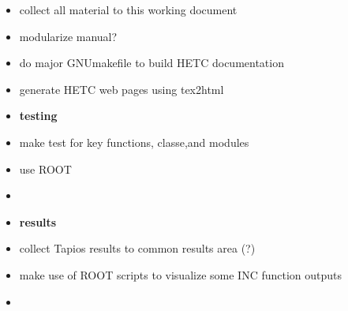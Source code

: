 \begin{itemize}
\item collect all material to this working document
\item modularize manual?
\item do major GNUmakefile to build HETC documentation
\item generate HETC web pages using tex2html

\end{itemize}



\begin{itemize}
\item {\bf testing}
\item make test for key functions, classe,and modules
\item use ROOT
\item
\end{itemize}



\begin{itemize}
\item {\bf results}
\item collect Tapios results to common results area (?)
\item make use of ROOT scripts to visualize some INC function outputs
\item
\end{itemize}

